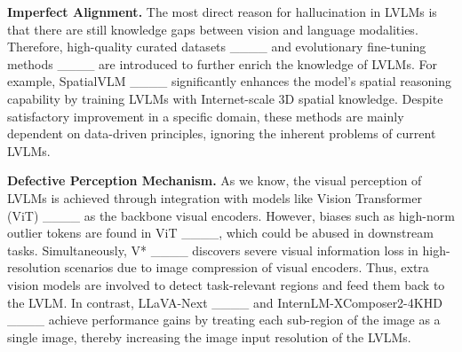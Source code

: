 \textbf{Imperfect Alignment.} 
The most direct reason for hallucination in LVLMs is that there are still knowledge gaps between vision and language modalities. Therefore, high-quality curated datasets ____ and evolutionary fine-tuning methods ____ are introduced to further enrich the knowledge of LVLMs. 
For example, SpatialVLM ____ significantly enhances the model's spatial reasoning capability by training LVLMs with Internet-scale 3D spatial knowledge. Despite satisfactory improvement in a specific domain, these methods are mainly dependent on data-driven principles, ignoring the inherent problems of current LVLMs.

\textbf{Defective Perception Mechanism.}
As we know, the visual perception of LVLMs is achieved through integration with models like Vision Transformer (ViT) ____ as the backbone visual encoders. However, biases such as high-norm outlier tokens are found in ViT ____, which could be abused in downstream tasks. Simultaneously, V* ____ discovers severe visual information loss in high-resolution scenarios due to image compression of visual encoders. Thus, extra vision models are involved to detect task-relevant regions and feed them back to the LVLM. In contrast, LLaVA-Next ____ and InternLM-XComposer2-4KHD ____ achieve performance gains by treating each sub-region of the image as a single image, thereby increasing the image input resolution of the LVLMs. 

